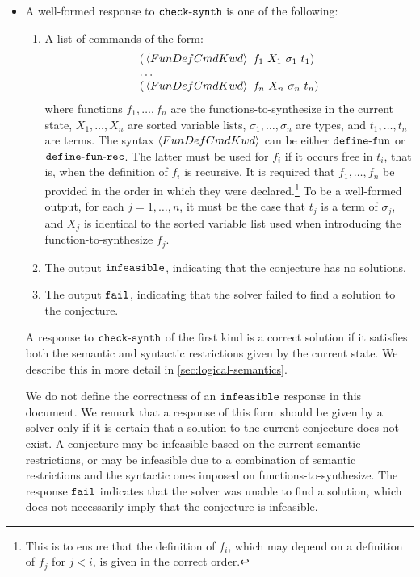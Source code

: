 \documentclass[english,a4paper,10pt]{article}
\begin{document}
\begin{itemize}
\item
A well-formed response to ${\tt check\mbox{-}synth}$ is one of the following:

\begin{enumerate}
\item
A list of commands of the form:
\[
\begin{array}{l}
{\tt (}\left\langle FunDefCmdKwd\right\rangle\mbox{ }f_{1}\mbox{ }X_{1}\mbox{ }\sigma_{1}\mbox{ }t_{1}{\tt )}\\
\ldots\\
{\tt (}\left\langle FunDefCmdKwd\right\rangle\mbox{ }f_{n}\mbox{ }X_{n}\mbox{ }\sigma_{n}\mbox{ }t_{n}{\tt )}
\end{array}
\]
where functions $f_{1}, \ldots, f_{n}$
are the functions-to-synthesize in the current state,
$X_{1}, \ldots, X_{n}$ are sorted variable lists,
$\sigma_{1}, \ldots, \sigma_{n}$ are types,
and $t_{1}, \ldots, t_{n}$ are terms.
The syntax $\left\langle FunDefCmdKwd\right\rangle$ can be either ${\tt define\mbox{-}fun}$ or ${\tt define\mbox{-}fun\mbox{-}rec}$.
The latter must be used for $f_i$ if it occurs free in $t_i$,
that is, when the definition of $f_i$ is recursive.
It is required that $f_1, \ldots, f_n$ be
provided in the order in which they were declared.\footnote{
This is to ensure that the definition of $f_i$, which may depend on a definition
of $f_j$ for $j<i$, is given in the correct order.
}
To be a well-formed output, 
for each $j=1, \ldots, n$, it must be the case that
$t_{j}$ is a term of $\sigma_{j}$,
and $X_{j}$ is identical to the sorted variable list
used when introducing the function-to-synthesize $f_{j}$.

\item
The output ${\tt infeasible}$,
indicating that the conjecture has no solutions.

\item
The output ${\tt fail}$,
indicating that the solver failed to find a solution to the conjecture.

\end{enumerate}

A response to ${\tt check\mbox{-}synth}$ of the first kind is a correct solution if
it satisfies both the semantic and syntactic restrictions given by
the current state.
We describe this in more detail in \cref{sec:logical-semantics}.

We do not define the correctness of an ${\tt infeasible}$ response 
in this document. 
We remark that a response of this form should be given
by a solver only if it is certain that a solution to the current
conjecture does not exist.
A conjecture may be infeasible based on the current semantic
restrictions, or may be infeasible due to a combination
of semantic restrictions and the syntactic ones imposed on functions-to-synthesize.
The response ${\tt fail}$ indicates that the solver
was unable to find a solution, which does not necessarily imply that
the conjecture is infeasible.

\end{itemize}
\end{document}
